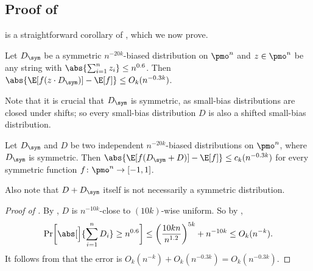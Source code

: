 \subsection{Proof of }

 is a straightforward corollary of , which we now prove.

\begin{theorem} \label{thm:shifted-sym-bias-special}
  Let $D_\sym$ be a symmetric $n^{-20k}$-biased distribution on $\pmo^n$ and $z \in \pmo^n$ be any string with $\abs{\sum_{i=1}^n z_i} \le n^{0.6}$.
  Then $\abs{\E[f(z \cdot D_\sym)] - \E[f]} \le O_k(n^{-0.3k})$.
\end{theorem}

Note that it is crucial that $D_\sym$ is symmetric, as small-bias distributions are closed under shifts; so every small-bias distribution $D$ is also a shifted small-bias distribution.

\begin{corollary} \label{cor:shifted-sym-bias-special}
Let $D_\sym$ and $D$ be two independent $n^{-20k}$-biased distributions on $\pmo^n$, where $D_\sym$ is symmetric.
Then $\abs{\E[f(D_\sym + D)] - \E[f]} \le c_k(n^{-0.3k})$ for every symmetric function $f\colon\pmo^n \to [-1,1]$.
\end{corollary}

Also note that $D + D_\sym$ itself is not necessarily a symmetric distribution.

\begin{proof}[Proof of ]
  By , $D$ is $n^{-10k}$-close to $(10k)$-wise uniform.
  So by ,
  \[
    \Pr\biggl[ \abs[\Big]{\sum_{i=1}^n D_i} \ge n^{0.6} \biggr] 
    \le \left(\frac{10kn}{n^{1.2}}\right)^{5k} + n^{-10k}
    \le O_k(n^{-k}) .
  \]
  It follows from  that the error is $O_k(n^{-k}) + O_k(n^{-0.3k}) = O_k(n^{-0.3k})$.
\end{proof}

